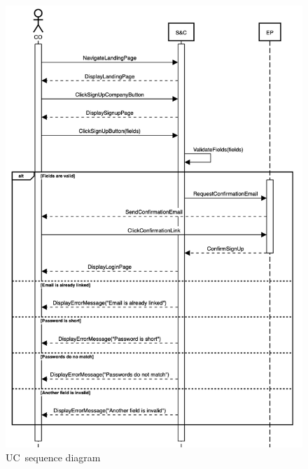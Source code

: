 \begin{figure}
    \centering
    \includegraphics[width=13cm]{images/sequence-diagrams/company-signs-up.png}
    \caption{UC\theuc\ sequence diagram}
\end{figure}


\clearpage

